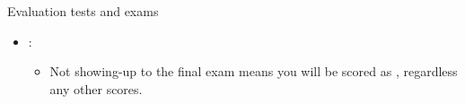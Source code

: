 \begin{frame}[t]{Evaluation tests and exams}
\begin{itemize}
  \item {}:
    \begin{itemize}
      \item Not showing-up to the final exam means you will be scored 
            as , 
            regardless any other scores.
    \end{itemize}
\end{itemize}
\end{frame}
